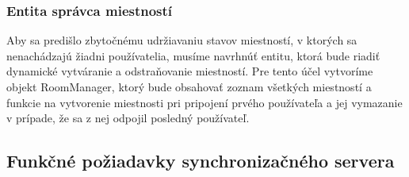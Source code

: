 \subsubsection{Entita správca miestností}
Aby sa predišlo zbytočnému udržiavaniu stavov miestností, v ktorých sa nenachádzajú žiadni používatelia, musíme navrhnúť entitu, ktorá bude riadiť dynamické vytváranie a odstraňovanie miestností. Pre tento účel vytvoríme objekt RoomManager, ktorý bude obsahovať zoznam všetkých miestností a funkcie na vytvorenie miestnosti pri pripojení prvého používateľa a jej vymazanie v prípade, že sa z nej odpojil posledný používateľ.

\subsection{Funkčné požiadavky synchronizačného servera}

